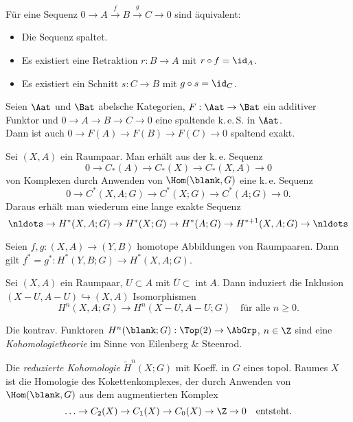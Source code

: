 \documentclass{cheat-sheet}
\newcommand{\RH}{\tilde{H}} %
\DeclareMathOperator{\inte}{int} %
\newcommand{\clos}[1]{\overline{#1}} %
\newcommand{\keS}{k.\,e.\,S.} %
\begin{document}
\begin{prop}
  Für eine Sequenz $0 \to A \xrightarrow{f} B \xrightarrow{g} C \to 0$ sind äquivalent:
  \begin{itemize}
    \item Die Sequenz spaltet.
    \item Es existiert eine Retraktion $r : B \to A$ mit $r \circ f = \id_A$.
    \item Es existiert ein Schnitt $s : C \to B$ mit $g \circ s = \id_C$.
  \end{itemize}
\end{prop}

\begin{prop}
  Seien $\Aat$ und $\Bat$ abelsche Kategorien, $F : \Aat \to \Bat$ ein additiver Funktor und $0 \to A \to B \to C \to 0$ eine spaltende \keS{} in $\Aat$.\\
  Dann ist auch $0 \to F(A) \to F(B) \to F(C) \to 0$ spaltend exakt.
\end{prop}

\begin{bem}
  Sei $(X, A)$ ein Raumpaar.
  Man erhält aus der k.\,e. Sequenz
  \[ 0 \to C_*(A) \to C_*(X) \to C_*(X, A) \to 0 \]
  von Komplexen durch Anwenden von $\Hom(\blank, G)$ eine k.\,e. Sequenz
  \[ 0 \to C^*(X, A; G) \to C^*(X; G) \to C^*(A; G) \to 0. \]
  Daraus erhält man wiederum eine lange exakte Sequenz
  \[ \nldots \to H^*(X, A; G) \to H^*(X; G) \to H^*(A; G) \to H^{*+1}(X, A; G) \to \nldots \]
\end{bem}

\begin{prop}
  Seien $f, g : (X, A) \to (Y, B)$ homotope Abbildungen von Raumpaaren. Dann gilt
  $f^* = g^* : H^*(Y, B; G) \to H^*(X, A; G)$.
\end{prop}

\begin{satz}
  Sei $(X, A)$ ein Raumpaar, $U \subset A$ mit $\clos{U} \subset \inte A$. Dann induziert die Inklusion $(X - U, A - U) \hookrightarrow (X, A)$ Isomorphismen
  \[ H^n(X, A; G) \to H^n(X - U, A - U; G) \quad \text{für alle $n \geq 0$.} \]
\end{satz}

\begin{bem}
  Die kontrav. Funktoren $H^n(\blank; G) : \Top(2) \to \AbGrp$, $n \in \Z$ sind eine \emph{Kohomologietheorie} im Sinne von Eilenberg \& Steenrod.
\end{bem}

\begin{defn}
  Die \emph{reduzierte Kohomologie} $\RH^n(X; G)$ mit Koeff. in $G$ eines topol. Raumes $X$ ist die Homologie des Kokettenkomplexes, der durch Anwenden von $\Hom(\blank, G)$ aus dem augmentierten Komplex
  \[
    \ldots \to C_2(X) \to C_1(X) \to C_0(X) \to \Z \to 0
    \quad \text{entsteht.}
  \]
\end{defn}
\end{document}
